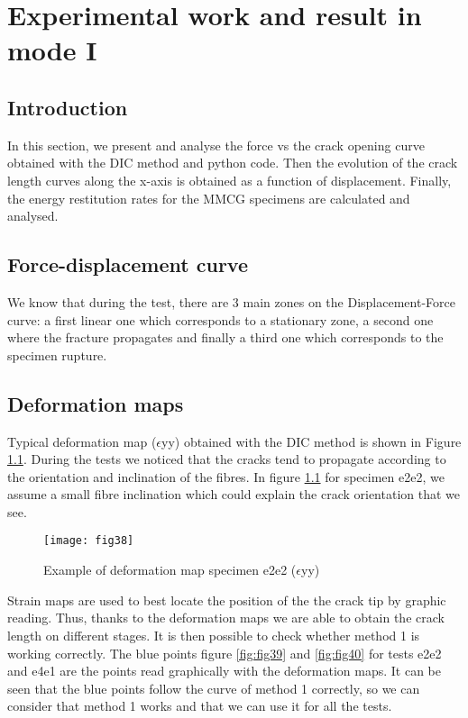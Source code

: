 \chapter{Experimental work and result in mode I}
\label{Chapter3}

\section{Introduction}

In this section, we present and analyse the force vs the crack opening curve obtained with the DIC method and python code.  Then the evolution of the crack length curves along the x-axis is obtained as a function of displacement. Finally, the energy restitution rates for the MMCG specimens are calculated and analysed.

\section{Force-displacement curve}

We know that during the test, there are 3 main zones on the Displacement-Force curve: a first linear one which corresponds to a stationary zone, a second one where the fracture propagates and finally a third one which corresponds to the specimen rupture.

\section{Deformation maps}

Typical deformation map ($\epsilon$yy) obtained with the DIC method is shown in Figure \ref{fig:fig38}.
During the tests we noticed that the cracks tend to propagate according to the orientation and inclination of the fibres.
In figure \ref{fig:fig38} for specimen e2e2, we assume a small fibre inclination which could explain the crack orientation that we see.

\begin{figure}[htp]
	\centering
	\texttt{[image: fig38]}
	\caption{Example of deformation map specimen e2e2 ($\epsilon$yy)}
	\label{fig:fig38}
\end{figure}

Strain maps are used to best locate the position of the the crack tip by graphic reading.
Thus, thanks to the deformation maps we are able to obtain the crack length on different stages. It is then possible to check whether method 1 is working correctly.
The blue points figure \ref{fig:fig39} and \ref{fig:fig40} for tests e2e2 and e4e1 are the points read graphically with the deformation maps. It can be seen that the blue points follow the curve of method 1 correctly, so we can consider that method 1 works and that we can use it for all the tests.

